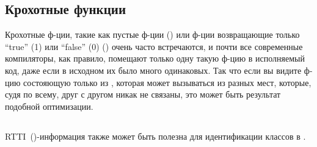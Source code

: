 \subsection{Крохотные функции}

Крохотные ф-ции, такие как пустые ф-ции ()
или ф-ции возвращающие только ``true'' (1) или ``false'' (0) () очень часто встречаются,
и почти все современные компиляторы, как правило, помещают только одну такую ф-цию в исполняемый код,
даже если в исходном их было много одинаковых.
Так что если вы видите ф-цию состояющую только из , которая может вызываться из разных мест,
которые, судя по всему, друг с другом никак не связаны, это может быть результат подобной оптимизации.

\subsection{\Cpp}

\ac{RTTI}~()-информация также может быть полезна для идентификации 
классов в \Cpp.




